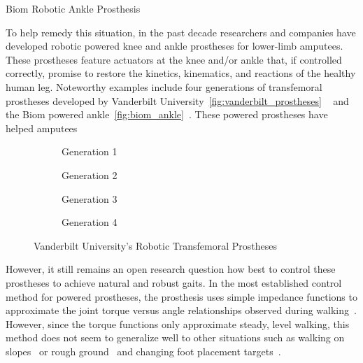 \begin{marginfigure}
    \centering
    \caption{Biom Robotic Ankle Prosthesis}
    \label{fig:biom_ankle}
\end{marginfigure}

To help remedy this situation, in the past decade researchers and companies have
developed robotic powered knee and ankle prostheses for lower-limb amputees.
These prostheses feature actuators at the knee and/or ankle that, if controlled
correctly, promise to restore the kinetics, kinematics, and reactions of the
healthy human leg. Noteworthy examples include four generations of transfemoral
prostheses developed by Vanderbilt University~\cref{fig:vanderbilt_prostheses}
~\citep{} and the Biom powered ankle~\cref{fig:biom_ankle}~\citep{}. These
powered prostheses have helped amputees 

\begin{figure*}
    \centering
	\begin{subfigure}[b]{0.2\textwidth}
    	\centering
        \caption{Generation 1}
	\end{subfigure}
	\begin{subfigure}[b]{0.2\textwidth}
    	\centering
        \caption{Generation 2}
	\end{subfigure}
	\begin{subfigure}[b]{0.2\textwidth}
    	\centering
        \caption{Generation 3}
	\end{subfigure}
	\begin{subfigure}[b]{0.2\textwidth}
    	\centering
        \caption{Generation 4}
	\end{subfigure}
    \caption{Vanderbilt University's Robotic Transfemoral Prostheses}
\end{figure*}

However, it still remains an open research question how best to control these
prostheses to achieve natural and robust gaits. In the most established control
method for powered prostheses, the prosthesis uses simple impedance functions to
approximate the joint torque versus angle relationships observed during
walking~\citep{sup2009preliminary}. However, since the torque functions only
approximate steady, level walking, this method does not seem to generalize well
to other situations such as walking on slopes~\citep{sup2011upslope} or rough
ground~\citep{thatte2016toward} and changing foot placement
targets~\citep{schepelmann2016evaluation}. 

